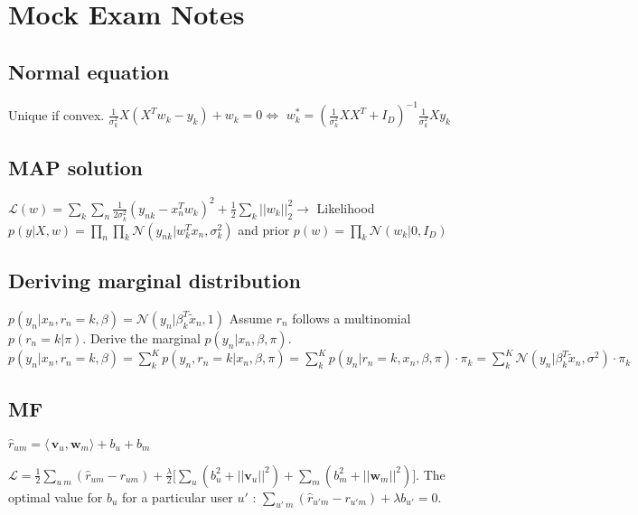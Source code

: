 \newline
\newline
\section{Mock Exam Notes}
\subsection{Normal equation}
Unique if convex.\newline
$\frac{1}{\sigma_k^2} X(X^Tw_k-y_k)+w_k = 0 \Leftrightarrow$ \newline
$ w_k^* = (\frac{1}{\sigma_k^2} XX^T+I_D)^{-1} \frac{1}{\sigma_k^2}Xy_k$

\subsection{MAP solution}
$\mathcal{L}(w) = \sum_k \sum_n \frac{1}{2\sigma_k^2} (y_{nk} - x_n^T w_k)^2 + \frac{1}{2} \sum_k ||w_k||^2_2 \rightarrow$
Likelihood $p(y|X,w) = \prod_n \prod_k \mathcal{N}(y_{nk}|w_k^Tx_n, \sigma_k^2)$ and prior $p(w) = \prod_k \mathcal{N}(w_k|0,I_D)$

\subsection{Deriving marginal distribution}
$p(y_n|x_n,r_n=k,\beta) = \mathcal{N} (y_n|\beta_k^T\tilde{x}_n,1)$
Assume $r_n$ follows a multinomial $p(r_n=k|\pi)$. Derive the marginal $p(y_n|x_n,\beta,\pi)$.
$p(y_n|x_n,r_n=k,\beta) = \sum_k^K p(y_n,r_n=k|x_n,\beta,\pi) = \sum_k^K p(y_n|r_n=k,x_n,\beta,\pi) \cdot \pi_k = \sum_k^K \mathcal{N}(y_n|\beta_k^T\tilde{x}_n, \sigma^2)\cdot \pi_k$

\subsection{MF}
$\hat{r}_{um} = \langle\,\mathbf{v}_u,\mathbf{w}_m\rangle + b_u + b_m$

$\mathcal{L} = \frac{1}{2} \sum_{u ~ m}(\hat{r}_{um} -r_{um}) + \frac{\lambda}{2} \big[
\sum_u (b_u^2+||\mathbf{v}_u||^2) + \sum_m (b_m^2+||\mathbf{w}_m||^2) \big]$. The optimal value for $b_u$ for a particular user $u'$ : $\sum_{u' ~ m} (\hat{r}_{u'm} - r_{u'm}) + \lambda b_{u'} = 0$.

